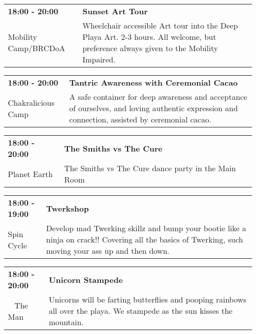 \begin{tabular}{ p{1in} p{2.2in} }
    \textbf{18:00 - 20:00} & \textbf{Sunset Art Tour} \\
    Mobility Camp/BRCDoA \newline  & Wheelchair accessible Art tour into the Deep Playa Art.
2-3 hours. All welcome, but preference always given to the Mobility Impaired. \\
    \hline 
\end{tabular}
    
\begin{tabular}{ p{1in} p{2.2in} }
    \textbf{18:00 - 20:00} & \textbf{Tantric Awareness with Ceremonial Cacao} \\
    Chakralicious Camp \newline  & A safe container for deep awareness and acceptance of ourselves, and loving authentic expression and connection, assisted by ceremonial cacao. \\
    \hline 
\end{tabular}
    
\begin{tabular}{ p{1in} p{2.2in} }
    \textbf{18:00 - 20:00} & \textbf{The Smiths vs The Cure} \\
    Planet Earth \newline  & The Smiths vs The Cure dance party in the Main Room \\
    \hline 
\end{tabular}
    
\begin{tabular}{ p{1in} p{2.2in} }
    \textbf{18:00 - 19:00} & \textbf{Twerkshop} \\
    Spin Cycle \newline  & Develop mad Twerking skillz and bump your bootie like a ninja on crack!! Covering all the basics of Twerking, such moving your ass up and then down. \\
    \hline 
\end{tabular}
    
\begin{tabular}{ p{1in} p{2.2in} }
    \textbf{18:00 - 20:00} & \textbf{Unicorn Stampede} \\
    ~ \newline The Man & Unicorns will be farting butterflies and pooping rainbows all over the playa. We stampede as the sun kisses the mountain. \\
    \hline 
\end{tabular}
    
